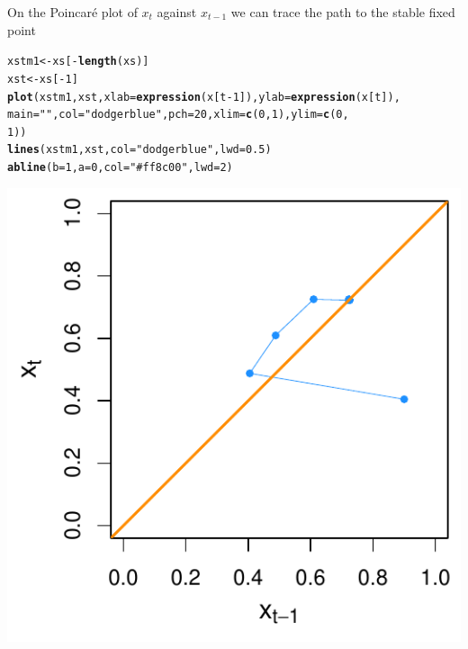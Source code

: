 \documentclass[a4paper]{article}\usepackage[]{graphicx}\usepackage[]{color}
\makeatletter
\def\maxwidth{ %
  \ifdim\Gin@nat@width>\linewidth
    \linewidth
  \else
    \Gin@nat@width
  \fi
}
\newcommand{\hlnum}[1]{\textcolor[rgb]{0.686,0.059,0.569}{#1}}%
\newcommand{\hlstr}[1]{\textcolor[rgb]{0.192,0.494,0.8}{#1}}%
\newcommand{\hlopt}[1]{\textcolor[rgb]{0,0,0}{#1}}%
\newcommand{\hlstd}[1]{\textcolor[rgb]{0.345,0.345,0.345}{#1}}%
\newcommand{\hlkwb}[1]{\textcolor[rgb]{0.69,0.353,0.396}{#1}}%
\newcommand{\hlkwc}[1]{\textcolor[rgb]{0.333,0.667,0.333}{#1}}%
\newcommand{\hlkwd}[1]{\textcolor[rgb]{0.737,0.353,0.396}{\textbf{#1}}}%
\newenvironment{kframe}{%
 \def\at@end@of@kframe{}%
 \ifinner\ifhmode%
  \def\at@end@of@kframe{\end{minipage}}%
  \begin{minipage}{\columnwidth}%
 \fi\fi%
 \def\FrameCommand##1{\hskip\@totalleftmargin \hskip-\fboxsep
 \colorbox{shadecolor}{##1}\hskip-\fboxsep
     \hskip-\linewidth \hskip-\@totalleftmargin \hskip\columnwidth}%
 \MakeFramed {\advance\hsize-\width
   \@totalleftmargin\z@ \linewidth\hsize
   \@setminipage}}%
 {\par\unskip\endMakeFramed%
 \at@end@of@kframe}
\newenvironment{knitrout}{}{} %
\makeatother
\begin{document}
On the Poincar\'e plot of $x_t$ against $x_{t-1}$ we can trace the path to the stable fixed point

\begin{knitrout}
\color{fgcolor}\begin{kframe}
\begin{alltt}
\hlstd{xstm1} \hlkwb{<-} \hlstd{xs[}\hlopt{-}\hlkwd{length}\hlstd{(xs)]}
\hlstd{xst} \hlkwb{<-} \hlstd{xs[}\hlopt{-}\hlnum{1}\hlstd{]}
\hlkwd{plot}\hlstd{(xstm1, xst,} \hlkwc{xlab} \hlstd{=} \hlkwd{expression}\hlstd{(x[t} \hlopt{-} \hlnum{1}\hlstd{]),} \hlkwc{ylab} \hlstd{=} \hlkwd{expression}\hlstd{(x[t]),}
    \hlkwc{main} \hlstd{=} \hlstr{""}\hlstd{,} \hlkwc{col} \hlstd{=} \hlstr{"dodgerblue"}\hlstd{,} \hlkwc{pch} \hlstd{=} \hlnum{20}\hlstd{,} \hlkwc{xlim} \hlstd{=} \hlkwd{c}\hlstd{(}\hlnum{0}\hlstd{,} \hlnum{1}\hlstd{),} \hlkwc{ylim} \hlstd{=} \hlkwd{c}\hlstd{(}\hlnum{0}\hlstd{,}
        \hlnum{1}\hlstd{))}
\hlkwd{lines}\hlstd{(xstm1, xst,} \hlkwc{col} \hlstd{=} \hlstr{"dodgerblue"}\hlstd{,} \hlkwc{lwd} \hlstd{=} \hlnum{0.5}\hlstd{)}
\hlkwd{abline}\hlstd{(}\hlkwc{b} \hlstd{=} \hlnum{1}\hlstd{,} \hlkwc{a} \hlstd{=} \hlnum{0}\hlstd{,} \hlkwc{col} \hlstd{=} \hlstr{"#ff8c00"}\hlstd{,} \hlkwc{lwd} \hlstd{=} \hlnum{2}\hlstd{)}
\end{alltt}
\end{kframe}

{\centering \includegraphics[width=\maxwidth]{figure/minimal-unnamed-chunk-5-1} 

}



\end{knitrout}
\end{document}
